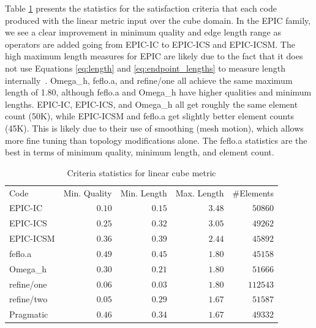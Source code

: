 \documentclass[3p,times,procedia,number]{elsarticle}
\begin{document}
Table \ref{tab:cube-linear-stats} presents the statistics
for the satisfaction criteria that each code
produced with the linear metric input over the cube domain.
In the EPIC family, we see a clear improvement in minimum
quality and edge length range as operators are added
going from EPIC-IC to EPIC-ICS and EPIC-ICSM.
The high maximum length measures for EPIC are likely due
to the fact that it does not use Equations \ref{eq:length}
and \ref{eq:endpoint_lengths} to measure length
internally~\cite{park-loseille-krakos-michal-adapt-decomposition}.
Omega\_h, feflo.a, and refine/one
all achieve the same maximum length of 1.80, although
feflo.a and Omega\_h have higher qualities
and minimum lengths.
EPIC-IC, EPIC-ICS, and Omega\_h all get roughly
the same element count (50K), while EPIC-ICSM and feflo.a
get slightly better element counts (45K).
This is likely due to their use of smoothing (mesh motion),
which allows more fine tuning than topology modifications alone.
The feflo.a statistics are the best in terms of minimum
quality,
minimum length, and element count.

\begin{table}
\caption{Criteria statistics for linear cube metric}
\label{tab:cube-linear-stats}
\begin{tabular}{lrrrr}
Code & Min. Quality & Min. Length & Max. Length & \#Elements\\
EPIC-IC     & $0.10$&       $0.15$&       $3.48$&   $ 50860$\\
EPIC-ICS    & $0.25$&       $0.32$&       $3.05$&   $ 49262$\\
EPIC-ICSM   & $0.36$&       $0.39$&       $2.44$&   $ 45892$\\
feflo.a     & $0.49$&       $0.45$&       $1.80$&   $ 45158$\\
Omega\_h    & $0.30$&       $0.21$&       $1.80$&   $ 51666$\\
refine/one  & $0.06$&       $0.03$&       $1.80$&   $112543$\\
refine/two  & $0.05$&       $0.29$&       $1.67$&   $ 51587$\\
Pragmatic   & $0.46$&       $0.34$&       $1.67$&   $ 49332$\\
\end{tabular}
\end{table}
\end{document}
